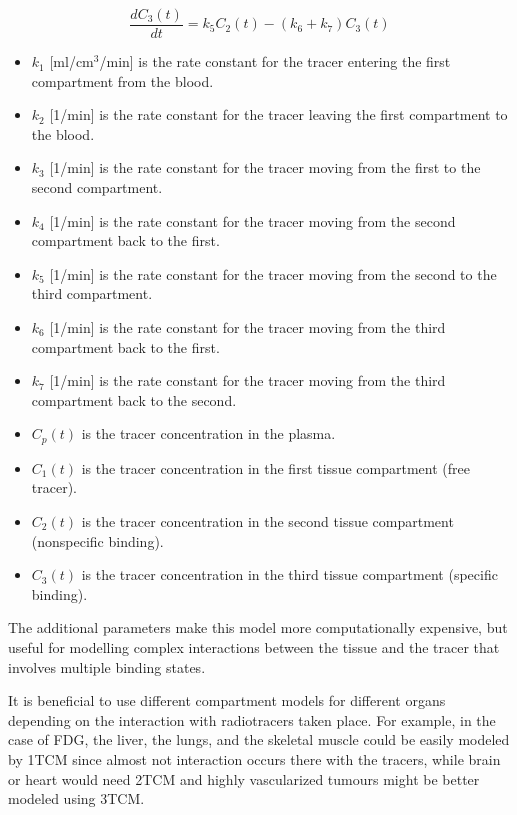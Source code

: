 \begin{equation}
\frac{dC_3(t)}{dt} = k_5 C_2(t) - (k_6 + k_7) C_3(t)
\end{equation}

\begin{itemize}
    \item $k_1$ [ml/cm$^3$/min] is the rate constant for the tracer entering the first compartment from the blood.
    \item $k_2$ [1/min] is the rate constant for the tracer leaving the first compartment to the blood.
    \item $k_3$ [1/min] is the rate constant for the tracer moving from the first to the second compartment.
    \item $k_4$ [1/min] is the rate constant for the tracer moving from the second compartment back to the first.
    \item $k_5$ [1/min] is the rate constant for the tracer moving from the second to the third compartment.
    \item $k_6$ [1/min] is the rate constant for the tracer moving from the third compartment back to the first.
    \item $k_7$ [1/min] is the rate constant for the tracer moving from the third compartment back to the second.
    \item $C_p(t)$ is the tracer concentration in the plasma.
    \item $C_1(t)$ is the tracer concentration in the first tissue compartment (free tracer).
    \item $C_2(t)$ is the tracer concentration in the second tissue compartment (nonspecific binding).
    \item $C_3(t)$ is the tracer concentration in the third tissue compartment (specific binding).
\end{itemize}


The additional parameters make this model more computationally expensive, but useful for modelling complex interactions between the tissue and the tracer that involves multiple binding states.

It is beneficial to use different compartment models for different organs depending on the interaction with radiotracers taken place. For example, in the case of FDG, the liver, the lungs, and the skeletal muscle could be easily modeled by 1TCM since almost not interaction occurs there with the tracers, while brain or heart would need 2TCM and highly vascularized tumours might be better modeled using 3TCM.

